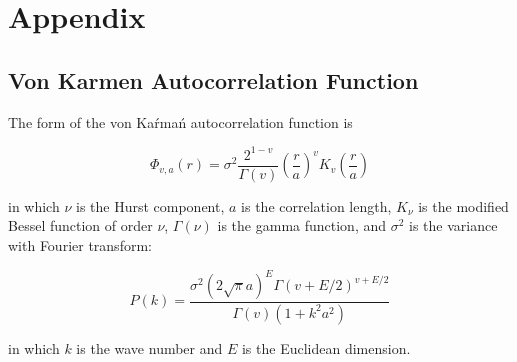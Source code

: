 
\appendix
\linespread{1.7}
\chapter*{Appendix}
\linespread{2.0}
\renewcommand{\thesection}{A}
\renewcommand{\thesubsection}{A\arabic{subsection}}
\renewcommand{\thefigure}{A\arabic{figure}}
\renewcommand{\theequation}{A\arabic{equation}}
\renewcommand{\thetable}{A\arabic{table}}


\linespread{1.7}
\section{Von Karmen Autocorrelation Function}
\linespread{2.0}
\label{app:A}

The form of the von Ka\'rma\'n autocorrelation function \citep{frankelFiniteDifferenceSimulations1986} is

\begin{equation}\label{eq:app-A1}
    \Phi_{v, a}(r)=\sigma^{2} \frac{2^{1-v}}{\Gamma(v)}\left(\frac{r}{a}\right)^{v} K_{v}\left(\frac{r}{a}\right)
\end{equation}

\noindent in which $\nu$ is the Hurst component, $a$ is the correlation length, $K_{\nu}$ is the modified Bessel function of order $\nu$, $\Gamma(\nu)$ is the gamma function, and $\sigma^2$ is the variance with Fourier transform:

\begin{equation}\label{eq:app-A2}
    P(k)=\frac{\sigma^{2}(2 \sqrt{\pi} a)^{E} \Gamma(v+E / 2)^{v+E / 2}}{\Gamma(v)\left(1+k^{2} a^{2}\right)}
\end{equation}

\noindent in which $k$ is the wave number and $E$ is the Euclidean dimension.







